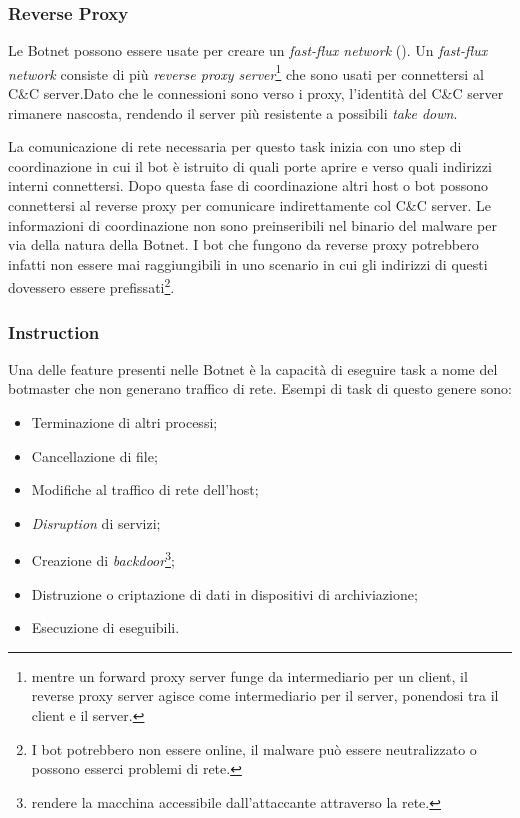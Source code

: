 \subsubsection{Reverse Proxy}
Le Botnet possono essere usate per creare un \textit{fast-flux network} (). Un \textit{fast-flux network} consiste di più \textit{reverse proxy server}\footnote{mentre un forward proxy server funge da intermediario per un client, il reverse proxy server agisce come intermediario per il server, ponendosi tra il client e il server.} che sono usati per connettersi al C\&C server.Dato che le connessioni sono verso i proxy, l'identità del C\&C server rimanere nascosta, rendendo il server più resistente a possibili \textit{take down}.

La comunicazione di rete necessaria per questo task inizia con uno step di coordinazione in cui il bot è istruito di quali porte aprire e verso quali indirizzi interni connettersi. Dopo questa fase di coordinazione altri host o bot possono connettersi al reverse proxy per comunicare indirettamente col C\&C server. Le informazioni di coordinazione non sono preinseribili nel binario del malware per via della natura della Botnet. I bot che fungono da reverse proxy potrebbero infatti  non essere mai raggiungibili  in uno scenario in cui gli indirizzi di questi dovessero essere prefissati\footnote{I bot potrebbero non essere online, il malware può essere neutralizzato o possono esserci problemi di rete.}.

\subsubsection{Instruction}
Una delle feature presenti nelle Botnet è la capacità di eseguire task a nome del botmaster che non generano traffico di rete. Esempi di task di questo genere sono: 
\begin{itemize}
    \item Terminazione di  altri processi;
    \item Cancellazione di  file;
    \item Modifiche al  traffico di rete dell'host;
    \item \textit{Disruption} di  servizi;
    \item Creazione di  \textit{backdoor}\footnote{rendere la macchina accessibile dall'attaccante attraverso la  rete.};
    \item Distruzione o criptazione di dati in dispositivi di archiviazione;
    \item Esecuzione di eseguibili.
\end{itemize}

